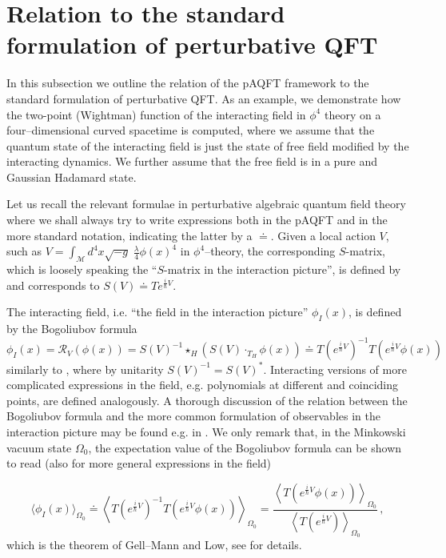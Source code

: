 \documentclass[10pt]{book}
\newcommand{\Mcal}{\mathcal{M}}
\theoremstyle{break}
\begin{document}
\section{Relation to the standard formulation of perturbative QFT}


In this subsection we outline the relation of the pAQFT framework to the standard formulation of perturbative QFT. As an example, we demonstrate how the two-point (Wightman) function of the interacting field in $\phi^4$ theory on a four--dimensional curved spacetime is computed, where we assume that the quantum state of the interacting field is just the state of free field modified by the interacting dynamics. We further assume that the free field is in a pure and Gaussian Hadamard state. 

Let us recall the relevant formulae in perturbative algebraic quantum field theory where we shall always try to write expressions both in the pAQFT and in the more standard notation, indicating the latter by a $\doteq$. Given a local action $V$, such as $V=\int_\Mcal d^4x \sqrt{-g} \; \frac{\lambda}{4} \phi(x)^4$ in $\phi^4$--theory, the corresponding $S$-matrix, which is loosely speaking the ``$S$-matrix in the interaction picture'', is defined by %
and corresponds to $S(V)\doteq T e^{\frac{i}{\hbar} V}$.

The interacting field, i.e. ``the field in the interaction picture'' $\phi_I(x)$, is defined by the Bogoliubov formula
\begin{equation}
\phi_I(x)=\mathcal{R}_V(\phi(x))=S(V)^{-1}\star_H\left(S(V)\cdot_{T_H} \phi(x)\right)\doteq T(e^{\frac{i}{\hbar} V})^{-1} T(e^{\frac{i}{\hbar} V}\phi(x))\,
\end{equation}
similarly to %
, where by unitarity $S(V)^{-1}=S(V)^*$. Interacting versions of more complicated expressions in the field, e.g. polynomials at different and coinciding points, are defined analogously. A thorough discussion of the relation between the Bogoliubov formula and the more common formulation of observables in the interaction picture may be found e.g. in %
. We only remark that, in the Minkowski vacuum state $\Omega_0$, the expectation value of the Bogoliubov formula can be shown to read (also for more general expressions in the field)

$$\langle \phi_I(x)\rangle_{\Omega_0} \doteq \left\langle T(e^{\frac{i}{\hbar} V})^{-1}T(e^{\frac{i}{\hbar} V}\phi(x))\right\rangle_{\Omega_0}=\frac{\left\langle T(e^{\frac{i}{\hbar} V}\phi(x))\right\rangle_{\Omega_0}}{\left\langle T(e^{\frac{i}{\hbar} V}) \right\rangle_{\Omega_0}}\,,$$
which is the theorem of Gell--Mann and Low, see %
for details.
\end{document}
